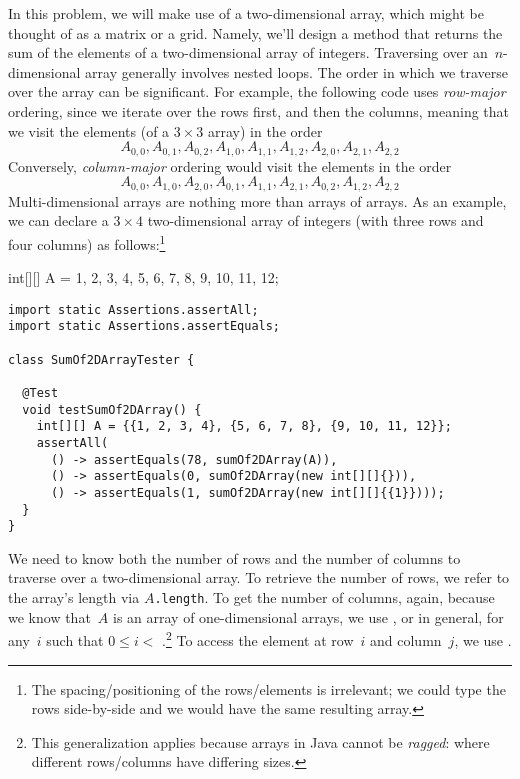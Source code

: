 In this problem, we will make use of a two-dimensional array, which might be thought of as a matrix or a grid. 
Namely, we'll design a method that returns the sum of the elements of a two-dimensional array of integers. 
Traversing over an~$n$-dimensional array generally involves nested loops. 
The order in which we traverse over the array can be significant. 
For example, the following code uses \emph{row-major} ordering, since we iterate over the rows first, and then the columns, meaning that we visit the elements (of a $3\times{3}$ array) in the order
\[
  A_{0,0}, A_{0,1}, A_{0,2}, A_{1,0}, A_{1,1}, A_{1,2}, A_{2,0}, A_{2,1}, A_{2,2}
\] 
Conversely, \emph{column-major} ordering would visit the elements in the order
\[
  A_{0,0}, A_{1,0}, A_{2,0}, A_{0,1}, A_{1,1}, A_{2,1}, A_{0,2}, A_{1,2}, A_{2,2}
\]
Multi-dimensional arrays are nothing more than arrays of arrays. 
As an example, we can declare a $3 \times 4$ two-dimensional array of integers (with three rows and four columns) as follows:\footnote{The spacing/positioning of the rows/elements is irrelevant; we could type the rows side-by-side and we would have the same resulting array.}

\begin{verbnobox}[\small]
int[][] A = {{1, 2, 3, 4}, 
             {5, 6, 7, 8}, 
             {9, 10, 11, 12}};
\end{verbnobox}

\enlargethispage{-3\baselineskip}
\begin{lstlisting}[language=MyJava]
import static Assertions.assertAll;
import static Assertions.assertEquals;

class SumOf2DArrayTester {

  @Test
  void testSumOf2DArray() {
    int[][] A = {{1, 2, 3, 4}, {5, 6, 7, 8}, {9, 10, 11, 12}};
    assertAll(
      () -> assertEquals(78, sumOf2DArray(A)),
      () -> assertEquals(0, sumOf2DArray(new int[][]{})),
      () -> assertEquals(1, sumOf2DArray(new int[][]{{1}})));
  }
}
\end{lstlisting}

We need to know both the number of rows and the number of columns to traverse over a two-dimensional array. 
To retrieve the number of rows, we refer to the array's length via \texttt{$A$.length}. 
To get the number of columns, again, because we know that~$A$ is an array of one-dimensional arrays, we use , or in general,  for any~$i$ such that $0 \leq i< $ .\footnote{This generalization applies because arrays in Java cannot be \emph{ragged}: where different rows/columns have differing sizes.} To access the element at row~$i$ and column~$j$, we use . 

